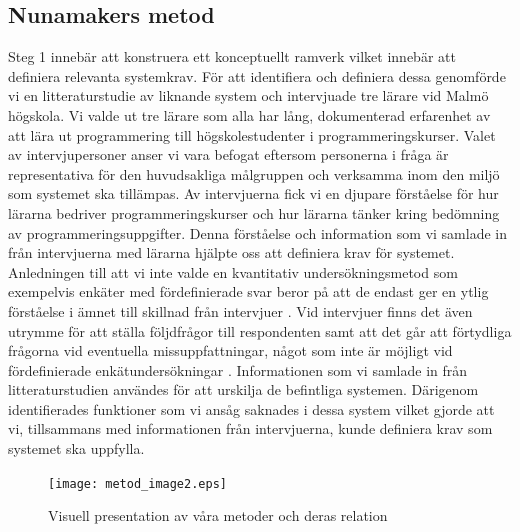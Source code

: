 \documentclass[a4paper,11pt]{article}
\begin{document}
{%

\subsection{Nunamakers metod}\label{Nunamakers metod}

Steg 1 innebär att konstruera ett konceptuellt ramverk vilket innebär att definiera relevanta systemkrav. För att identifiera och definiera dessa genomförde vi en litteraturstudie av liknande system och intervjuade tre lärare vid Malmö högskola. Vi valde ut tre lärare som alla har lång, dokumenterad erfarenhet av att lära ut programmering till högskolestudenter i programmeringskurser. Valet av intervjupersoner anser vi vara befogat eftersom personerna i fråga är representativa för den huvudsakliga målgruppen och verksamma inom den miljö som systemet ska tillämpas. Av intervjuerna fick vi en djupare förståelse för hur lärarna bedriver programmeringskurser och hur lärarna tänker kring bedömning av programmeringsuppgifter. Denna förståelse och information som vi samlade in från intervjuerna med lärarna hjälpte oss att definiera krav för systemet.
Anledningen till att vi inte valde en kvantitativ undersökningsmetod som exempelvis enkäter med fördefinierade svar beror på att de endast ger en ytlig förståelse i ämnet till skillnad från intervjuer \cite{seminarieboken}. Vid intervjuer finns det även utrymme för att ställa följdfrågor till respondenten samt att det går att förtydliga frågorna vid eventuella missuppfattningar, något som inte är möjligt vid fördefinierade enkätundersökningar \cite{seminarieboken}. Informationen som vi samlade in från litteraturstudien användes för att urskilja de befintliga systemen. Därigenom identifierades funktioner som vi ansåg saknades i dessa system vilket gjorde att vi, tillsammans med informationen från intervjuerna, kunde definiera krav som systemet ska uppfylla.

\newpage

\begin{figure}[ht!]
\centering
\texttt{[image: metod\_image2.eps]}
\caption{Visuell presentation av våra metoder och deras relation}
\label{fig:metod_visual}
\end{figure}

}
\end{document}
